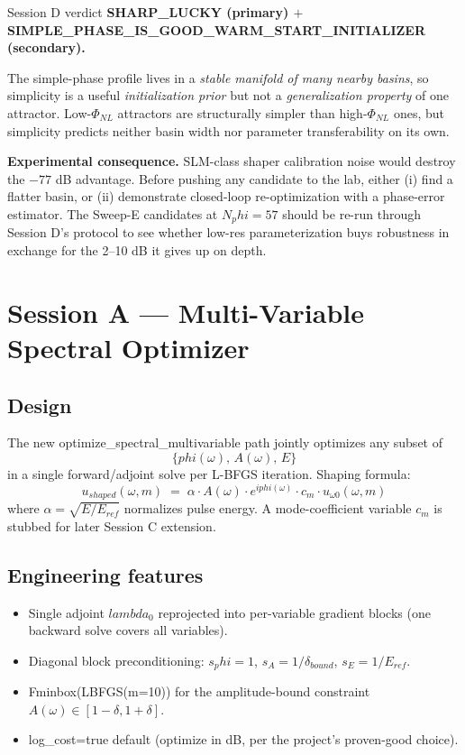 \documentclass[11pt,letterpaper]{article}
\def\varphi{phi}%
\def\mathrm#1{#1}%
\def\lambda{lambda}%
\def\texttt#1{#1}%
\begin{document}
\begin{verdict}{Session D verdict}
\textbf{SHARP\_LUCKY (primary) $+$ SIMPLE\_PHASE\_IS\_GOOD\_WARM\_START\_INITIALIZER (secondary).}

The simple-phase profile lives in a \emph{stable manifold of many nearby basins}, so simplicity is a useful \emph{initialization prior} but not a \emph{generalization property} of one attractor. Low-$\Phi_{\mathrm{NL}}$ attractors are structurally simpler than high-$\Phi_{\mathrm{NL}}$ ones, but simplicity predicts neither basin width nor parameter transferability on its own.

\textbf{Experimental consequence.} SLM-class shaper calibration noise would destroy the $-77$ dB advantage. Before pushing any candidate to the lab, either (i) find a flatter basin, or (ii) demonstrate closed-loop re-optimization with a phase-error estimator. The Sweep-E candidates at $\mathrm{N}_\varphi = 57$ should be re-run through Session D's protocol to see whether low-res parameterization buys robustness in exchange for the 2--10 dB it gives up on depth.
\end{verdict}

\newpage
\section{Session A --- Multi-Variable Spectral Optimizer}
\label{sec:sessionA}

\subsection{Design}

The new \texttt{optimize\_spectral\_multivariable} path jointly optimizes any subset of
\[
  \{\varphi(\omega),\, A(\omega),\, E\}
\]
in a single forward/adjoint solve per L-BFGS iteration. Shaping formula:
\[
  u_{\mathrm{shaped}}(\omega, m) \;=\; \alpha \cdot A(\omega) \cdot e^{i\varphi(\omega)} \cdot c_m \cdot u_{\omega 0}(\omega, m)
\]
where $\alpha = \sqrt{E / E_{\mathrm{ref}}}$ normalizes pulse energy. A mode-coefficient variable $c_m$ is stubbed for later Session C extension.

\subsection{Engineering features}

\begin{itemize}[leftmargin=*]
  \item Single adjoint $\lambda_0$ reprojected into per-variable gradient blocks (one backward solve covers all variables).
  \item Diagonal block preconditioning: $s_\varphi = 1$, $s_A = 1/\delta_{\mathrm{bound}}$, $s_E = 1/E_{\mathrm{ref}}$.
  \item \texttt{Fminbox(LBFGS(m=10))} for the amplitude-bound constraint $A(\omega) \in [1 - \delta, 1 + \delta]$.
  \item \texttt{log\_cost=true} default (optimize in dB, per the project's proven-good choice).
\end{itemize}
\end{document}
